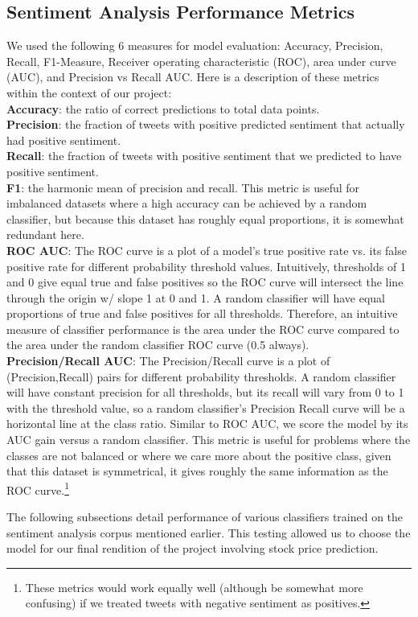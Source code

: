 \documentclass{sig-alternate-05-2015}
\begin{document}
	\subsection{Sentiment Analysis Performance Metrics}
	We used the following 6 measures for model evaluation: Accuracy, Precision, Recall, F1-Measure, Receiver operating characteristic (ROC), area under curve (AUC), and Precision vs Recall AUC. Here is a description of these metrics within the context of our project: \\
	\textbf{Accuracy}: the ratio of correct predictions to total data points. \\
	\textbf{Precision}: the fraction of tweets with positive predicted sentiment that actually had positive sentiment. \\
	\textbf{Recall}: the fraction of tweets with positive sentiment that we predicted to have positive sentiment. \\
	\textbf{F1}: the harmonic mean of precision and recall.  This metric is useful for imbalanced datasets where a high accuracy can be achieved by a random classifier, but because this dataset has roughly equal proportions, it is somewhat redundant here. \\
	\textbf{ROC AUC}:  The ROC curve is a plot of a model's true positive rate vs. its false positive rate for different probability threshold values.  Intuitively, thresholds of 1 and 0 give equal true and false positives so the ROC curve will intersect the line through the origin w/ slope 1 at 0 and 1.  A random classifier will have equal proportions of true and false positives for all thresholds.  Therefore, an intuitive measure of classifier performance is the area under the ROC curve compared to the area under the random classifier ROC curve (0.5 always). \\
	\textbf{Precision/Recall AUC}: The Precision/Recall curve is a plot of (Precision,Recall) pairs for different probability thresholds.  A random classifier will have constant precision for all thresholds, but its recall will vary from 0 to 1 with the threshold value, so a random classifier's Precision Recall curve will be a horizontal line at the class ratio.  Similar to ROC AUC, we score the model by its AUC gain versus a random classifier.  This metric is useful for problems where the classes are not balanced or where we care more about the positive class, given that this dataset is symmetrical, it gives roughly the same information as the ROC curve.\footnote{These metrics would work equally well (although be somewhat more confusing) if we treated tweets with negative sentiment as positives. }
	\par
	The following subsections detail performance of various classifiers trained on the sentiment analysis corpus mentioned earlier. This testing allowed us to choose the model for our final rendition of the project involving stock price prediction.
	
\end{document}
